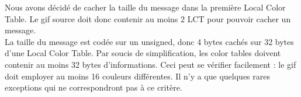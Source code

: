 Nous avons décidé de cacher la taille du message dans la première Local Color Table. 
Le gif source doit donc contenir au moins 2 LCT pour pouvoir cacher un message. \\

La taille du message est codée sur un unsigned, donc 4 bytes cachés sur 32 bytes d'une Local Color Table. 
Par soucis de simplification, les color tables doivent contenir au moins 32 bytes d'informations.
Ceci peut se vérifier facilement : le gif doit employer au moins 16 couleurs différentes. 
Il n'y a que quelques rares exceptions qui ne correspondront pas à ce critère.

\vspace{1.5cm}
